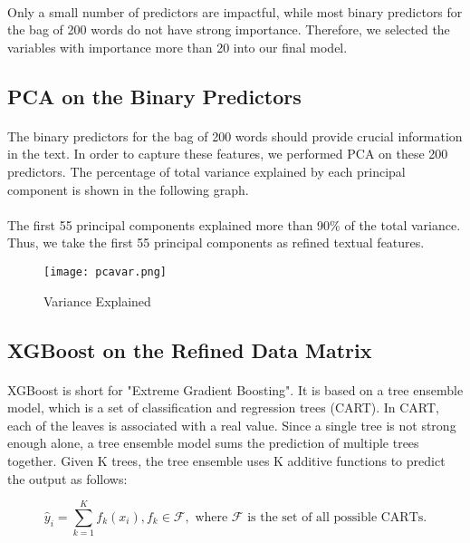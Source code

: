 \documentclass[paper=a4, fontsize=11pt]{scrartcl} %
\numberwithin{equation}{section} %
\numberwithin{figure}{section} %
\numberwithin{table}{section} %
\begin{document}
\paragraph{}
Only a small number of predictors are impactful, while most binary predictors for the bag of 200 words do not have strong importance. Therefore, we selected the variables with importance more than 20 into our final model.

\subsection{PCA on the Binary Predictors}
\paragraph{}
The binary predictors for the bag of 200 words should provide crucial information in the text. In order to capture these features, we performed PCA on these 200 predictors. The percentage of total variance explained by each principal component is shown in the following graph.
\paragraph{}
The first 55 principal components explained more than 90\% of the total variance. Thus, we take the first 55 principal components as refined textual features.

\begin{figure}[H]
    \centering
        \texttt{[image: pcavar.png]} 
        \caption{Variance Explained}
\end{figure}

\subsection{XGBoost on the Refined Data Matrix}
\paragraph{}
XGBoost is short for "Extreme Gradient Boosting". It is based on a tree ensemble model, which is a set of classification and regression trees (CART). In CART, each of the leaves is associated with a real value. Since a single tree is not strong enough alone, a tree ensemble model sums the prediction of multiple trees together. Given K trees, the tree ensemble uses K additive functions to predict the output as follows:

$$\hat{y}_i = \sum_{k=1}^K f_k (x_i), f_k \in \mathcal{F}, \text{ where } \mathcal{F} \text{ is the set of all possible CARTs}.$$
\end{document}
